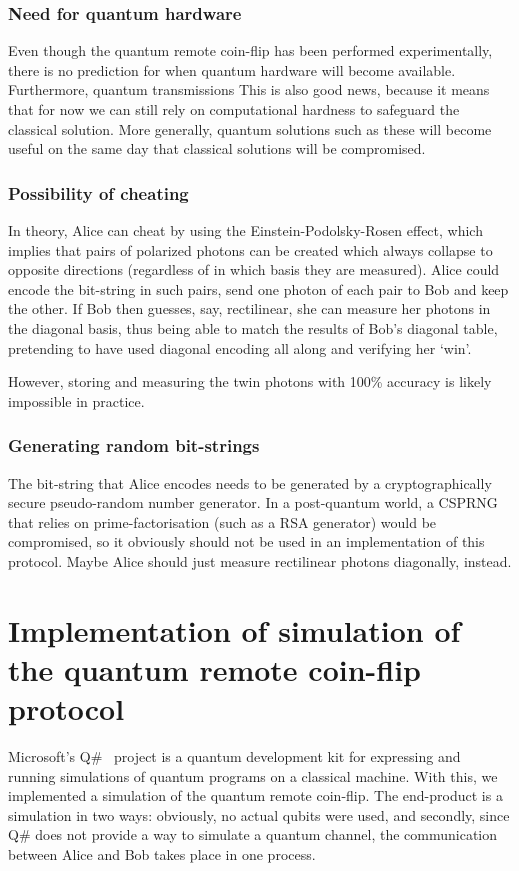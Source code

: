 \documentclass[oneside,a4paper]{article}
\begin{document}
\subsubsection{Need for quantum hardware} %
Even though the quantum remote coin-flip has been performed experimentally, there is no prediction for when quantum hardware will become available.
Furthermore, quantum transmissions 
This is also good news, because it means that for now we can still rely on computational hardness to safeguard the classical solution.
More generally, quantum solutions such as these will become useful on the same day that classical solutions will be compromised.

\subsubsection{Possibility of cheating}
In theory, Alice can cheat by using the Einstein-Podolsky-Rosen effect, which implies that pairs of polarized photons can be created which always collapse to opposite directions (regardless of in which basis they are measured).
Alice could encode the bit-string in such pairs, send one photon of each pair to Bob and keep the other.
If Bob then guesses, say, rectilinear, she can measure her photons in the diagonal basis, thus being able to match the results of Bob's diagonal table, pretending to have used diagonal encoding all along and verifying her `win'.

However, storing and measuring the twin photons with 100\% accuracy is likely impossible in practice.

\subsubsection{Generating random bit-strings}
The bit-string that Alice encodes needs to be generated by a cryptographically secure pseudo-random number generator.
In a post-quantum world, a CSPRNG that relies on prime-factorisation (such as a RSA generator) would be compromised, so it obviously should not be used in an implementation of this protocol.
Maybe Alice should just measure rectilinear photons diagonally, instead.


\section{Implementation of simulation of the quantum remote coin-flip protocol}
Microsoft's Q\#~\cite{qsharp} project is a quantum development kit for expressing and running simulations of quantum programs on a classical machine.
With this, we implemented a simulation of the quantum remote coin-flip.
The end-product is a simulation in two ways: obviously, no actual qubits were used, and secondly, since Q\# does not provide a way to simulate a quantum channel, the communication between Alice and Bob takes place in one process.
\end{document}

